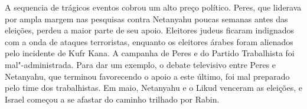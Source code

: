 A sequencia de trágicos eventos cobrou um alto preço político. Peres,
que liderava por ampla margem nas pesquisas contra Netanyahu poucas
semanas antes das eleições, perdeu a maior parte de seu apoio. Eleitores
judeus ficaram indignados com a onda de ataques terroristas, enquanto os
eleitores árabes foram alienados pelo incidente de Kufr Kana. A campanha
de Peres e do Partido Trabalhista foi mal"-administrada. Para dar um
exemplo, o debate televisivo entre Peres e Netanyahu, que terminou
favorecendo o apoio a este último, foi mal preparado pelo time dos
trabalhistas. Em maio, Netanyahu e o Likud venceram as eleições, e Israel
começou a se afastar do caminho trilhado por Rabin.
